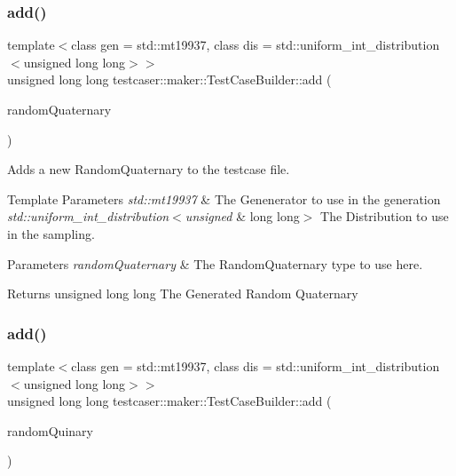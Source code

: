 \subsubsection{\texorpdfstring{add()}{add()}\hspace{0.1cm}{\footnotesize\ttfamily [7/11]}}
{\footnotesize\ttfamily template$<$class gen  = std\+::mt19937, class dis  = std\+::uniform\+\_\+int\+\_\+distribution$<$unsigned long long$>$$>$ \\
unsigned long long testcaser\+::maker\+::\+Test\+Case\+Builder\+::add (\begin{DoxyParamCaption}\item[{\mbox{\hyperlink{structtestcaser_1_1maker_1_1types_1_1RandomQuaternary}{types\+::\+Random\+Quaternary}}$<$ gen, dis $>$ \&}]{random\+Quaternary }\end{DoxyParamCaption})\hspace{0.3cm}{\ttfamily [inline]}}



Adds a new Random\+Quaternary to the testcase file. 


\begin{DoxyTemplParams}{Template Parameters}
{\em std\+::mt19937} & The Genenerator to use in the generation \\
\hline
{\em std\+::uniform\+\_\+int\+\_\+distribution$<$unsigned} & long long$>$ The Distribution to use in the sampling. \\
\hline
\end{DoxyTemplParams}

\begin{DoxyParams}{Parameters}
{\em random\+Quaternary} & The Random\+Quaternary type to use here. \\
\hline
\end{DoxyParams}
\begin{DoxyReturn}{Returns}
unsigned long long The Generated Random Quaternary 
\end{DoxyReturn}
\mbox{\label{classtestcaser_1_1maker_1_1TestCaseBuilder_a8c036fe574ac265ebbe37225727047e6}} 
\subsubsection{\texorpdfstring{add()}{add()}\hspace{0.1cm}{\footnotesize\ttfamily [8/11]}}
{\footnotesize\ttfamily template$<$class gen  = std\+::mt19937, class dis  = std\+::uniform\+\_\+int\+\_\+distribution$<$unsigned long long$>$$>$ \\
unsigned long long testcaser\+::maker\+::\+Test\+Case\+Builder\+::add (\begin{DoxyParamCaption}\item[{\mbox{\hyperlink{structtestcaser_1_1maker_1_1types_1_1RandomQuinary}{types\+::\+Random\+Quinary}}$<$ gen, dis $>$ \&}]{random\+Quinary }\end{DoxyParamCaption})\hspace{0.3cm}{\ttfamily [inline]}}



